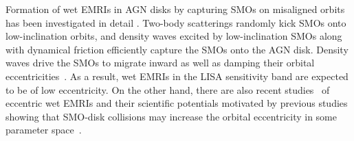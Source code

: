 \documentclass[aps,prx,reprint,superscriptaddress,nofootinbib,longbibliography]{revtex4-1}
\begin{document}
Formation of wet EMRIs in AGN disks by capturing SMOs on misaligned orbits has been investigated in detail \cite{PhysRevD.105.083005}. 
Two-body scatterings randomly kick SMOs onto low-inclination orbits, and  density waves excited by low-inclination SMOs along with dynamical friction efficiently capture the SMOs onto the AGN disk. Density waves drive the SMOs to migrate inward as well as damping their orbital eccentricities~\cite{Tanaka_2002,Tanaka_2004}. As a result, wet EMRIs in the LISA sensitivity band are expected to be of low eccentricity. On the other hand, there are also recent studies~\cite{10.1093/mnras/stae1239,PhysRevD.111.084006} of eccentric wet EMRIs and their scientific potentials motivated by previous studies showing that SMO-disk collisions may increase the orbital eccentricity in some parameter space~\cite{Secunda_2021,Wang2024}.
 
\end{document}
